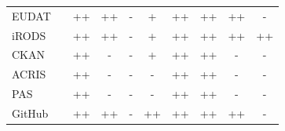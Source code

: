 \begin{table}
{\begin{tabular}{| l | c |c | c | c | c | c | c | c | c |}
            \cline{3-10}\cline{1-1}
            \cellcolor{first-column-blue}EUDAT       && \cellcolor{green}++ & \cellcolor{green}++ & \cellcolor{red}- & \cellcolor{yellow}+  & \cellcolor{green}++  &  \cellcolor{green}++ & \cellcolor{green}++  & \cellcolor{red}- \\
            \cline{3-10}\cline{1-1}
            \cellcolor{first-column-blue}iRODS       && \cellcolor{green}++ & \cellcolor{green}++ & \cellcolor{red}-  & \cellcolor{yellow}+  & \cellcolor{green}++  &  \cellcolor{green}++ & \cellcolor{green}++  & \cellcolor{green}++ \\
            \cline{3-10}\cline{1-1}
            \cellcolor{first-column-blue}CKAN        && \cellcolor{green}++ & \cellcolor{red}- & \cellcolor{red}- & \cellcolor{yellow}+ & \cellcolor{green}++  &  \cellcolor{green}++ & \cellcolor{red}-  & \cellcolor{red}- \\
            \cline{3-10}\cline{1-1}
            \cellcolor{first-column-blue}ACRIS       && \cellcolor{green}++  & \cellcolor{red}-  & \cellcolor{red}-  & \cellcolor{red}-  & \cellcolor{green}++  &  \cellcolor{green}++ & \cellcolor{red}-  & \cellcolor{red}- \\
            \cline{3-10}\cline{1-1}
            \cellcolor{first-column-blue}PAS         && \cellcolor{green}++ & \cellcolor{red}- & \cellcolor{red}- & \cellcolor{red}-  & \cellcolor{green}++ &  \cellcolor{green}++ & \cellcolor{red}-  & \cellcolor{red}- \\
            \cline{3-10}\cline{1-1}
            \cellcolor{first-column-blue}GitHub      && \cellcolor{green}++ & \cellcolor{green}++  & \cellcolor{red}- & \cellcolor{green}++ & \cellcolor{green}++  &  \cellcolor{green}++ & \cellcolor{green}++ & \cellcolor{red}- \\
            \cline{3-10}\cline{1-1}
        \end{tabular}
    }
\end{table}

